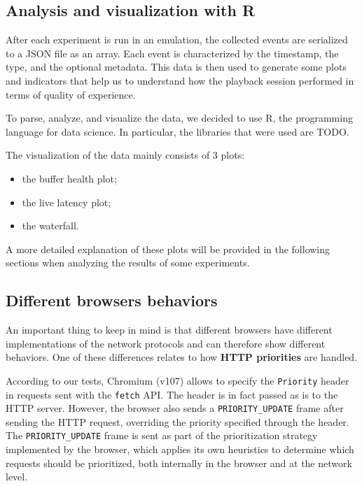 \subsection{Analysis and visualization with R}
\label{sec:eval/testbed/dataviz}

After each experiment is run in an emulation, the collected events are serialized to a JSON file as an array. Each event is characterized by the timestamp, the type, and the optional metadata. This data is then used to generate some plots and indicators that help us to understand how the playback session performed in terms of quality of experience.

To parse, analyze, and visualize the data, we decided to use R, the programming language for data science. In particular, the libraries that were used are TODO.

The visualization of the data mainly consists of 3 plots:

\begin{itemize}
    \item the buffer health plot;
    \item the live latency plot;
    \item the waterfall.
\end{itemize}

A more detailed explanation of these plots will be provided in the following sections when analyzing the results of some experiments.

\subsection{Different browsers behaviors}
\label{sec:eval/browsers}

An important thing to keep in mind is that different browsers have different implementations of the network protocols and can therefore show different behaviors. One of these differences relates to how \textbf{HTTP priorities} are handled.

According to our tests, Chromium (v107) allows to specify the \texttt{Priority} header in requests sent with the \texttt{fetch} API. The header is in fact passed as is to the HTTP server. However, the browser also sends a \texttt{PRIORITY\_UPDATE} frame after sending the HTTP request, overriding the priority specified through the header. The \texttt{PRIORITY\_UPDATE} frame is sent as part of the prioritization strategy implemented by the browser, which applies its own heuristics to determine which requests should be prioritized, both internally in the browser and at the network level.

